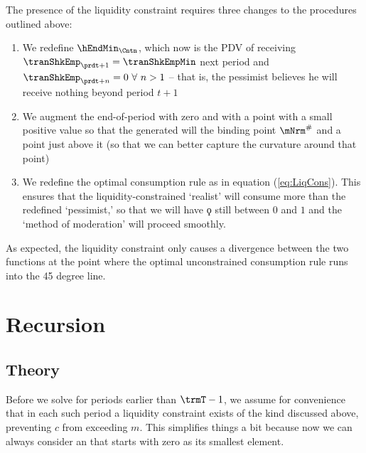 The presence of the liquidity
constraint requires three changes to the procedures outlined above:
\begin{enumerate}
\item We redefine
  $\hEndMin_{\Cntn}$, which now is the PDV of receiving
  $\tranShkEmp_{\prdt+1}=\tranShkEmpMin$ next period and
  $\tranShkEmp_{\prdt+n}=0~\forall~n>1$ -- that is, the pessimist believes he
  will receive nothing beyond period $t+1$
\item We augment the end-of-period  with zero and with a point with a small positive value so that the generated
  {\mVec} will the binding point $\mNrm^{\#}$ and a point just above it (so that we can better capture the curvature
  around that point)
\item We redefine the optimal consumption rule as
  in equation (\ref{eq:LiqCons}).  This ensures that the
  liquidity-constrained `realist' will consume more than the redefined
  `pessimist,' so that we will have $\koppa$ still between $0$ and $1$
  and the `method of moderation' will proceed smoothly.
\end{enumerate}

As expected, the liquidity constraint only causes a divergence between the two functions at the point where the optimal unconstrained consumption rule runs into the 45 degree line.

\hypertarget{recursion}{}
\section{Recursion}\label{sec:recursion}

\hypertarget{theory}{}
\subsection{Theory}
Before we solve for periods earlier than $\trmT-1$, we assume for
convenience that in each such period a liquidity constraint exists of
the kind discussed above, preventing $c$ from exceeding $m$. This
simplifies things a bit because now we can always consider an
 that starts with zero as its smallest element.

